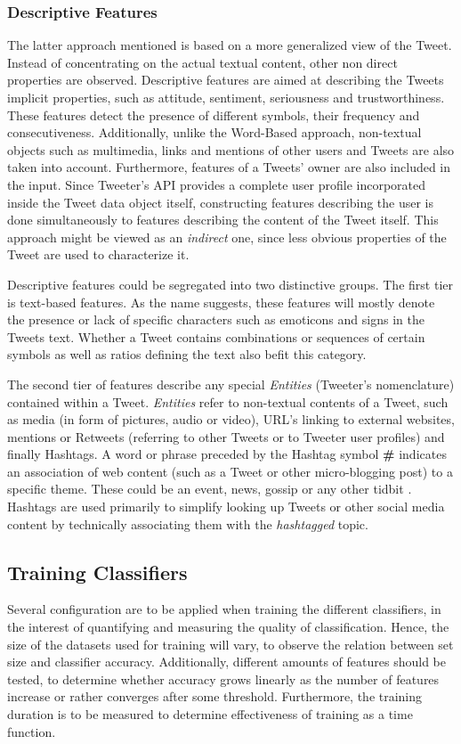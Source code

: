 		\subsubsection{Descriptive Features}
			\label{section:Descriptive_Features}
			The latter approach mentioned is based on a more generalized view of the Tweet. Instead of concentrating on the actual textual content, other non direct properties are observed. Descriptive features are aimed at describing the Tweets implicit properties, such as attitude, sentiment, seriousness and trustworthiness. These features detect the presence of different symbols, their frequency and consecutiveness. Additionally, unlike the Word-Based approach, non-textual objects such as multimedia, links and mentions of other users and Tweets are also taken into account. Furthermore, features of a Tweets' owner are also included in the input. Since Tweeter's API provides a complete user profile incorporated inside the Tweet data object itself, constructing features describing the user is done simultaneously to features describing the content of the Tweet itself. This approach might be viewed as an \textit{indirect} one, since less obvious properties of the Tweet are used to characterize it.
			\par
			Descriptive features could be segregated into two distinctive groups. The first tier is text-based features. As the name suggests, these features will mostly denote the presence or lack of specific characters such as emoticons and signs in the Tweets text. Whether a Tweet contains combinations or sequences of certain symbols as well as ratios defining the text also befit this category.
			\par
			The second tier of features describe any special \textit{Entities} (Tweeter's nomenclature) contained within a Tweet. \textit{Entities} refer to non-textual contents of a Tweet, such as media (in form of pictures, audio or video), URL's linking to external websites, mentions or Retweets (referring to other Tweets or to Tweeter user profiles) and finally Hashtags. A word or phrase preceded by the Hashtag symbol \textbf{\#} indicates an association of web content (such as a Tweet or other micro-blogging post) to a specific theme. These could be an event, news, gossip or any other tidbit \cite{dict_Tweet}. Hashtags are used primarily to simplify looking up Tweets or other social media content by technically associating them with the \textit{hashtagged} topic.
			
	\subsection{Training Classifiers}
		Several configuration are to be applied when training the different classifiers, in the interest of quantifying and measuring the quality of classification. Hence, the size of the datasets used for training will vary, to observe the relation between set size and classifier accuracy. Additionally, different amounts of features should be tested, to determine whether accuracy grows linearly as the number of features increase or rather converges after some threshold. Furthermore, the training duration is to be measured to determine effectiveness of training as a time function.
		
